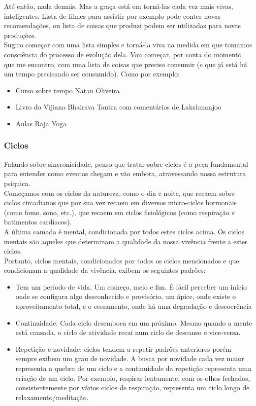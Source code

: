 \documentclass[11pt]{article}
\begin{document}
Até então, nada demais. Mas a graça está em torná-las cada vez mais vivas, inteligentes. Lista de filmes para assistir por exemplo pode conter novas recomendações, ou lista de coisas que produzi podem ser utilizadas para novas produções.\\

Sugiro começar com uma lista simples e torná-la viva na medida em que tomamos consciência do processo de evolução dela. Vou começar, por conta do momento que me encontro, com uma lista de coisas que preciso consumir (e que já está há um tempo precisando ser consumido). Como por exemplo:

\begin{itemize}
\item Curso sobre tempo Natan Oliveira
\item Livro do Vijiana Bhairava Tantra com comentários de Lakshmanjoo
\item Aulas Raja Yoga
\end{itemize}

\subsubsection{Ciclos}

Falando sobre sincronicidade, penso que tratar sobre ciclos é a peça fundamental para entender como eventos chegam e vão embora, atravessando nossa estrutura psíquica. \\

Começamos com os ciclos da natureza, como o dia e noite, que recaem sobre ciclos circadianos que por sua vez recaem em diversos micro-ciclos hormonais (como fome, sono, etc.), que recaem em ciclos fisiológicos (como respiração e batimentos cardíacos). \\

A última camada é mental, condicionada por todos estes ciclos acima. Os ciclos mentais são aqueles que determinam a qualidade da nossa vivência frente a estes ciclos. \\

Portanto, ciclos mentais, condicionados por todos os ciclos mencionados e que condicionam a qualidade da vivência, exibem os seguintes padrões:

\begin{itemize}
    \item Tem um período de vida. Um começo, meio e fim. É fácil perceber um início onde se configura algo desconhecido e provisório, um ápice, onde existe o aproveitamento total, e o cessamento, onde há uma degradação e descoerência
    \item Continuidade: Cada ciclo desemboca em um próximo. Mesmo quando a mente está cansada, o ciclo de atividade recai num ciclo de descanso e vice-versa.
    \item Repetição e novidade: ciclos tendem a repetir padrões anteriores porém sempre exibem um grau de novidade. A busca por novidade cada vez maior representa a quebra de um ciclo e a continuidade da repetição representa uma criação de um ciclo. Por exemplo, respirar lentamente, com os olhos fechados, consistentemente por vários ciclos de respiração, representa um ciclo longo de relaxamento/meditação.
\end{itemize}
\end{document}
